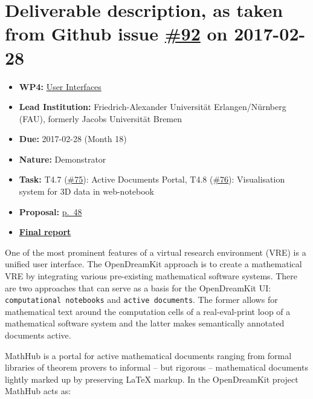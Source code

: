 \section*{\texorpdfstring{Deliverable description, as taken from Github
issue
\href{https://github.com/OpenDreamKit/OpenDreamKit/issues/92}{\#92} on
2017-02-28}{Deliverable description, as taken from Github issue \#92 on 2017-02-28}}\label{deliverable-description-as-taken-from-github-issue-92-on-2017-02-28}

\begin{itemize}
\tightlist
\item
  \textbf{WP4:}
  \href{https://github.com/OpenDreamKit/OpenDreamKit/tree/master/WP4}{User
  Interfaces}
\item
  \textbf{Lead Institution:} Friedrich-Alexander Universität
  Erlangen/Nürnberg (FAU), formerly Jacobs Universität Bremen
\item
  \textbf{Due:} 2017-02-28 (Month 18)
\item
  \textbf{Nature:} Demonstrator
\item
  \textbf{Task:} T4.7
  (\href{https://github.com/OpenDreamKit/OpenDreamKit/issues/75}{\#75}):
  Active Documents Portal, T4.8
  (\href{https://github.com/OpenDreamKit/OpenDreamKit/issues/76}{\#76}):
  Visualisation system for 3D data in web-notebook
\item
  \textbf{Proposal:}
  \href{https://github.com/OpenDreamKit/OpenDreamKit/raw/master/Proposal/proposal-www.pdf}{p.~48}
\item
  \href{https://github.com/OpenDreamKit/OpenDreamKit/raw/master/WP4/D4.3/report-final.pdf}{\textbf{Final
  report}}
\end{itemize}

One of the most prominent features of a virtual research environment
(VRE) is a unified user interface. The OpenDreamKit approach is to
create a mathematical VRE by integrating various pre-existing
mathematical software systems. There are two approaches that can serve
as a basis for the OpenDreamKit UI: \texttt{computational\ notebooks}
and \texttt{active\ documents}. The former allows for mathematical text
around the computation cells of a real-eval-print loop of a mathematical
software system and the latter makes semantically annotated documents
active.

MathHub is a portal for active mathematical documents ranging from
formal libraries of theorem provers to informal -- but rigorous --
mathematical documents lightly marked up by preserving LaTeX markup. In
the OpenDreamKit project MathHub acts as:

